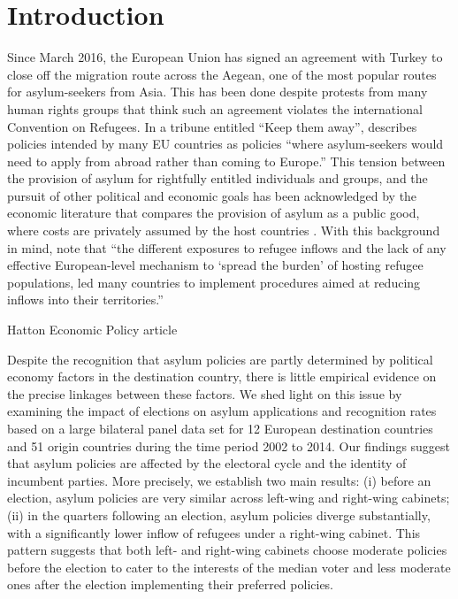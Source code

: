 \documentclass[a4paper,12pt]{article}
\begin{document}
\section{Introduction}\label{Introduction}
Since March 2016, the European Union has signed an agreement with Turkey to close off the migration route across the Aegean, one of the most popular routes for asylum-seekers from Asia. This has been done despite protests from many human rights groups that think such an agreement violates the international Convention on Refugees. In a tribune entitled ``Keep them away'', \textit{\cite{Economist2017}} describes policies intended by many EU countries as policies ``where asylum-seekers would need to apply from abroad rather than coming to Europe.'' This tension between the provision of asylum for rightfully entitled individuals and groups, and the pursuit of other political and economic goals has been acknowledged by the economic literature that compares the provision of asylum as a public good, where costs are privately assumed by the host countries \citep{moraga2014}. With this background in mind, \cite{dustmann2016} note that ``the  different  exposures  to  refugee  inflows and  the  lack  of  any  effective  European-level  mechanism  to  `spread  the  burden'  of  hosting  refugee  populations,  led  many  countries  to  implement  procedures  aimed  at  reducing  inflows  into  their  territories.''

Hatton Economic Policy article

Despite the recognition that asylum policies are partly determined by political economy factors in the destination country, there is little empirical evidence on the precise linkages between these factors. We shed light on this issue by examining the impact of elections on asylum applications and recognition rates based on a large bilateral panel data set for 12 European destination countries and 51 origin countries during the time period 2002 to 2014. Our findings suggest that asylum policies are affected by the electoral cycle and the identity of incumbent parties. More precisely, we establish two main results: (i) before an election, asylum policies are very similar across left-wing and right-wing cabinets; (ii)  in the quarters following an election, asylum policies diverge substantially, with a significantly lower inflow of refugees under a right-wing cabinet. This pattern suggests that both left- and right-wing cabinets choose moderate policies before the election to cater to the interests of the median voter and less moderate ones after the election implementing their preferred policies. 
\end{document}
